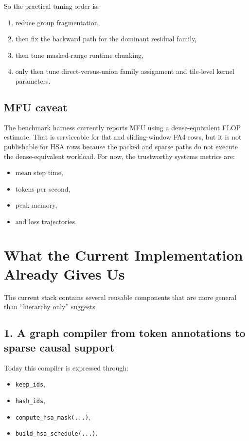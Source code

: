 \documentclass[11pt]{article}
\begin{document}
So the practical tuning order is:
\begin{enumerate}[leftmargin=1.5em]
    \item reduce group fragmentation,
    \item then fix the backward path for the dominant residual family,
    \item then tune masked-range runtime chunking,
    \item only then tune direct-versus-union family assignment and tile-level
    kernel parameters.
\end{enumerate}

\subsection{MFU caveat}

The benchmark harness currently reports MFU using a dense-equivalent FLOP
estimate. That is serviceable for flat and sliding-window FA4 rows, but it is
not publishable for HSA rows because the packed and sparse paths do not execute
the dense-equivalent workload. For now, the trustworthy systems metrics are:
\begin{itemize}[leftmargin=1.5em]
    \item mean step time,
    \item tokens per second,
    \item peak memory,
    \item and loss trajectories.
\end{itemize}

\section{What the Current Implementation Already Gives Us}

The current stack contains several reusable components that are more general
than ``hierarchy only'' suggests.

\subsection{1. A graph compiler from token annotations to sparse causal support}

Today this compiler is expressed through:
\begin{itemize}[leftmargin=1.5em]
    \item \texttt{keep\_ids},
    \item \texttt{hash\_ids},
    \item \texttt{compute\_hsa\_mask(...)},
    \item \texttt{build\_hsa\_schedule(...)}.
\end{itemize}
\end{document}
